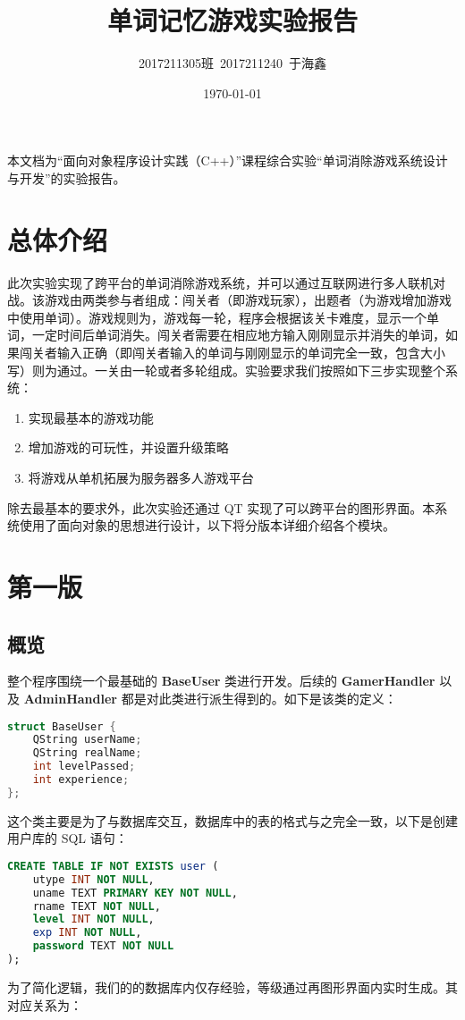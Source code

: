 \documentclass[blue,normal,cn]{elegantnote}
\title{单词记忆游戏实验报告}
\date{\today}
\author{2017211305班\ 2017211240\ 于海鑫}
\begin{document}
\maketitle
本文档为``面向对象程序设计实践（C++）''课程综合实验``单词消除游戏系统设计与开发''的实验报告。

\section{总体介绍}
此次实验实现了跨平台的单词消除游戏系统，并可以通过互联网进行多人联机对战。该游戏由两类参与者组成：闯关者（即游戏玩家），出题者（为游戏增加游戏中使用单词）。游戏规则为，游戏每一轮，程序会根据该关卡难度，显示一个单词，一定时间后单词消失。闯关者需要在相应地方输入刚刚显示并消失的单词，如果闯关者输入正确（即闯关者输入的单词与刚刚显示的单词完全一致，包含大小写）则为通过。一关由一轮或者多轮组成。实验要求我们按照如下三步实现整个系统：
\begin{enumerate}
	\item 实现最基本的游戏功能
	\item 增加游戏的可玩性，并设置升级策略
	\item 将游戏从单机拓展为服务器多人游戏平台
\end{enumerate}

除去最基本的要求外，此次实验还通过 QT 实现了可以跨平台的图形界面。本系统使用了面向对象的思想进行设计，以下将分版本详细介绍各个模块。

\section{第一版}
\subsection{概览}
整个程序围绕一个最基础的 \textbf{BaseUser} 类进行开发。后续的 \textbf{GamerHandler} 以及 \textbf{AdminHandler} 都是对此类进行派生得到的。如下是该类的定义：
\begin{lstlisting}[language=C++]
struct BaseUser {
    QString userName;
    QString realName;
    int levelPassed;
    int experience;
};
\end{lstlisting}
这个类主要是为了与数据库交互，数据库中的表的格式与之完全一致，以下是创建用户库的 SQL 语句：
\begin{lstlisting}[language=SQL]
CREATE TABLE IF NOT EXISTS user (
    utype INT NOT NULL,
    uname TEXT PRIMARY KEY NOT NULL,
    rname TEXT NOT NULL,
    level INT NOT NULL,
    exp INT NOT NULL,
    password TEXT NOT NULL
);
\end{lstlisting}
为了简化逻辑，我们的的数据库内仅存经验，等级通过再图形界面内实时生成。其对应关系为：
\end{document}
